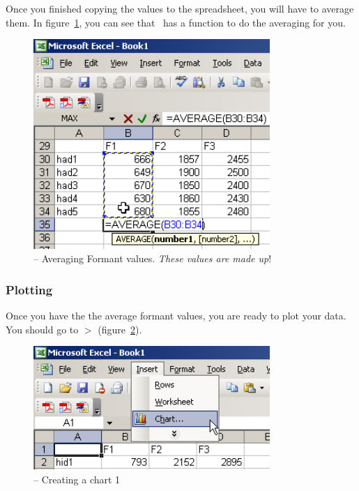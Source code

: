 Once you finished copying the values to the spreadsheet, you will have to average them. In figure~\ref{step2save}, you can see that~\MSExcel{} has a function to do the averaging for you.

\begin{figure}[!tbp]
\caption{\MSExcel{} -- Averaging Formant values. \emph{These values are made up}!}
\label{step2save}
	\begin{center}
		\includegraphics[width=0.8\textwidth]{./figures/Excel3}
	\end{center}
\end{figure}


\subsubsection{Plotting}

Once you have the the average formant values, you are ready to plot your data. You should go to  $>$  (figure~\ref{step1plot}).

\begin{figure}[!tbp]
\caption{\MSExcel{} -- Creating a chart 1}
\label{step1plot}
	\begin{center}
		\includegraphics[width=0.8\textwidth]{./figures/Excel2}
	\end{center}
\end{figure}

